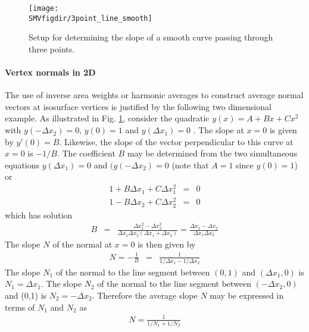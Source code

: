 \documentclass[11pt,twoside]{book}
\begin{document}
%
%

\begin{figure}[bph]
\begin{center}
\texttt{[image: \\SMVfigdir/3point\_line\_smooth]}
\end{center}
\caption{Setup for determining the slope of a smooth curve passing through three points.}
\label{figlinesmooth}%
\end{figure}

\paragraph{Vertex normals in 2D} The use of inverse area weights or
harmonic averages to construct average normal vectors at isosurface
vertices is justified by the following two dimensional example.
As illustrated in Fig. \ref{figlinesmooth}, consider the
quadratic $y(x)=A+Bx+Cx^2$ with $y(-\Delta x_2)=0$,
$y(0)=1$ and $y(\Delta x_1)=0$ .  The slope at $x=0$ is given by $y'(0)=B$.
Likewise, the slope of the vector perpendicular to this curve at $x=0$ is $-1/B$.
The coefficient $B$ may be determined from the two simultaneous equations
$y(\Delta x_1)=0$ and  $(y(-\Delta x_2)=0$ (note that $A=1$ since $y(0)=1$) or
\begin{eqnarray}
1+B\Delta x_1 + C \Delta x_1^2 &= &0\\
1-B\Delta x_2 + C \Delta x_2^2 &= &0
\end{eqnarray}
which has solution
\begin{eqnarray}
B&=&\frac{\Delta x_1^2-\Delta x_2^2}{\Delta x_1\Delta x_2(\Delta x_1+\Delta x_2)}=
\frac{\Delta x_1-\Delta x_2}{\Delta x_1\Delta x_2}
\end{eqnarray}
The slope $N$ of the normal at $x=0$ is then given by
\begin{eqnarray}
N=-\frac{1}{B}&=&\frac{1}{1/\Delta x_1-1/\Delta x_2}
\end{eqnarray}
The slope $N_1$ of the normal to the line segment between
$(0,1)$ and $(\Delta x_1,0)$ is $N_1=\Delta x_1$.
The slope $N_2$ of the normal to the line segment between
$(-\Delta x_2,0)$ and (0,1) is $N_2=-\Delta x_2$.
Therefore the average slope $N$ may be expressed in terms of
$N_1$ and $N_2$ as
\begin{eqnarray}
N=\frac{1}{1/N_1+1/N_2}
\end{eqnarray}
\end{document}
